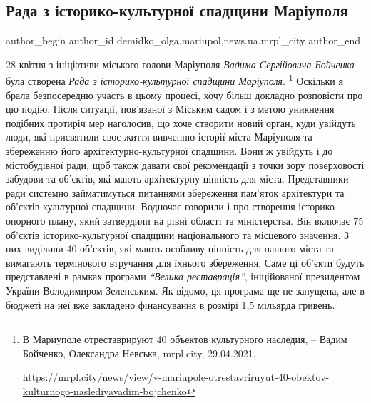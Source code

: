  
 
 
 
 
 
\subsection{Рада з історико-культурної спадщини Маріуполя}
\label{sec:29_04_2021.stz.news.ua.mrpl_city.1.rada_z_istoryko_kulturnoji_spadschyny_mrpl}
 
\ifcmt
 author_begin
   author_id demidko_olga.mariupol,news.ua.mrpl_city
 author_end
\fi


28 квітня з ініціативи міського голови Маріуполя \emph{Вадима Сергійовича Бойченка}
була створена \href{https://mrpl.city/news/view/v-mariupole-otrestavriruyut-40-obektov-kulturnogo-naslediyavadim-bojchenko}{%
\emph{Рада з історико-культурної спадщини Маріуполя}}.%
\footnote{В Мариуполе отреставрируют 40 объектов культурного наследия, – Вадим Бойченко, Олександра Невська, mrpl.city, 29.04.2021, \par%
\url{https://mrpl.city/news/view/v-mariupole-otrestavriruyut-40-obektov-kulturnogo-naslediyavadim-bojchenko}
}
Оскільки я брала безпосередню участь в цьому процесі, хочу більш докладно
розповісти про цю подію. Після ситуації, пов'язаної з Міським садом і з метою
уникнення подібних протиріч мер наголосив, що хоче створити новий орган, куди
увійдуть люди, які присвятили своє життя вивченню історії міста Маріуполя та
збереженню його архітектурно-культурної спадщини. Вони ж увійдуть і до
містобудівної ради, щоб також давати свої рекомендації з точки зору
поверховості забудови та об'єктів, які мають архітектурну цінність для міста.
Представники ради системно займатимуться питаннями збереження пам'яток
архітектури та об'єктів культурної спадщини. Водночас говорили і про створення
історико-опорного плану, який затвердили на рівні області та міністерства. Він
включає 75 об'єктів історико-культурної спадщини національного та місцевого
значення. З них виділили 40 об'єктів, які мають особливу цінність для нашого
міста та вимагають термінового втручання для їхнього збереження. Саме ці
об'єкти будуть представлені в рамках програми \emph{\enquote{Велика реставрація}},
ініційованої президентом України Володимиром Зеленським. Як відомо, ця програма
ще не запущена, але в бюджеті на неї вже закладено фінансування в розмірі 1,5
мільярда гривень.

